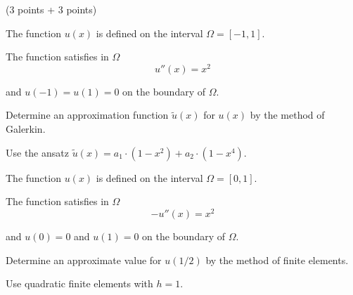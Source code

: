 (3 points + 3 points)
\begin{teilaufgaben}
\item
The function $u(x)$ is defined on the interval $\Omega = [-1, 1].$

The function satisfies in $\Omega$ 
\[
u''(x) = x^2
\]
 
and $u(-1) = u(1) = 0$ on the boundary of $\Omega$.

Determine an approximation function $\tilde u(x)$ for $u(x)$ by the
method of Galerkin. 

Use the ansatz $\tilde u(x) = a_1 \cdot (1-x^2) + a_2 \cdot (1-x^4).$

\item
The function $u(x)$ is defined on the interval $\Omega = [0, 1].$

The function satisfies in $\Omega$ 
\[
- u''(x) = x^2
\]
 
and $u(0) = 0$ and $u(1) = 0$ on the boundary of $\Omega$.  

Determine an approximate value for $u(1/2)$ by the method of finite elements.

Use quadratic finite elements with $h = 1$.
\end{teilaufgaben}

